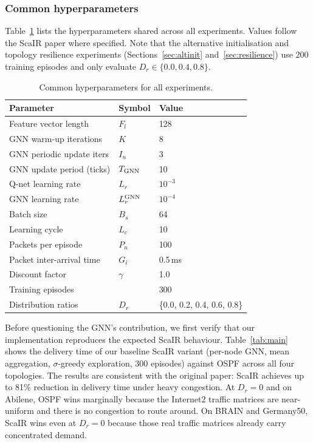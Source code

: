 \documentclass[10pt,twocolumn,letterpaper]{article}
\begin{document}
\subsubsection{Common hyperparameters}

Table~\ref{tab:hyper} lists the hyperparameters shared across all experiments. Values follow the ScaIR paper where specified. Note that the alternative initialisation and topology resilience experiments (Sections~\ref{sec:altinit} and~\ref{sec:resilience}) use 200 training episodes and only evaluate $D_r \in \{0.0, 0.4, 0.8\}$.

\begin{table}[t]
\centering
\caption{Common hyperparameters for all experiments.}
\label{tab:hyper}
\small
\setlength{\tabcolsep}{4pt}
\begin{tabular}{lll}
\toprule
Parameter & Symbol & Value \\
\midrule
Feature vector length      & $F_l$           & 128 \\
GNN warm-up iterations     & $K$             & 8 \\
GNN periodic update iters  & $I_n$           & 3 \\
GNN update period (ticks)  & $T_{\rm GNN}$   & 10 \\
Q-net learning rate        & $L_r$           & $10^{-3}$ \\
GNN learning rate          & $L_r^{\rm GNN}$ & $10^{-4}$ \\
Batch size                 & $B_s$           & 64 \\
Learning cycle             & $L_c$           & 10 \\
Packets per episode        & $P_n$           & 100 \\
Packet inter-arrival time  & $G_i$           & 0.5\,ms \\
Discount factor            & $\gamma$        & 1.0 \\
Training episodes          &                 & 300 \\
Distribution ratios        & $D_r$           & \{0.0, 0.2, 0.4, 0.6, 0.8\} \\
\bottomrule
\end{tabular}
\end{table}

Before questioning the GNN's contribution, we first verify that our implementation reproduces the expected ScaIR behaviour. Table~\ref{tab:main} shows the delivery time of our baseline ScaIR variant (per-node GNN, mean aggregation, $\sigma$-greedy exploration, 300 episodes) against OSPF across all four topologies. The results are consistent with the original paper: ScaIR achieves up to 81\% reduction in delivery time under heavy congestion. At $D_r = 0$ and on Abilene, OSPF wins marginally because the Internet2 traffic matrices are near-uniform and there is no congestion to route around. On BRAIN and Germany50, ScaIR wins even at $D_r = 0$ because those real traffic matrices already carry concentrated demand.
\end{document}
